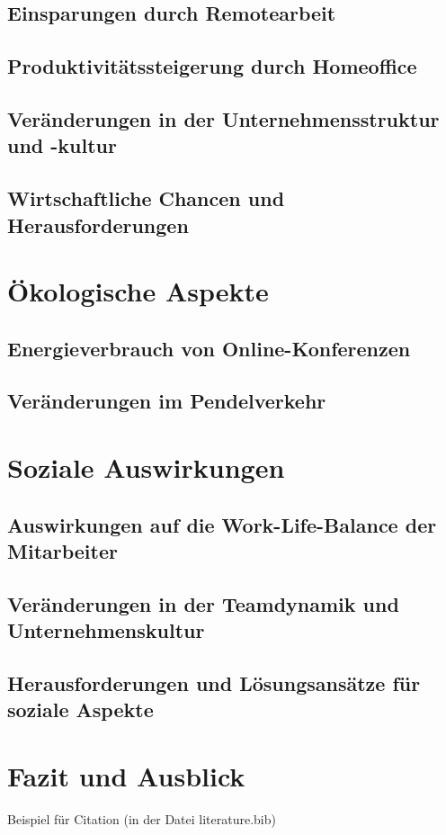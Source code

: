 \documentclass[runningheads]{llncs}
\begin{document}
\subsection{Einsparungen durch Remotearbeit}

\subsection{Produktivitätssteigerung durch Homeoffice}

\subsection{Veränderungen in der Unternehmensstruktur und -kultur}

\subsection{Wirtschaftliche Chancen und Herausforderungen}


\section{Ökologische Aspekte}

\subsection{Energieverbrauch von Online-Konferenzen}

\subsection{Veränderungen im Pendelverkehr}


\section{Soziale Auswirkungen}

\subsection{Auswirkungen auf die Work-Life-Balance der Mitarbeiter}

\subsection{Veränderungen in der Teamdynamik und Unternehmenskultur}

\subsection{Herausforderungen und Lösungsansätze für soziale Aspekte}


\section{Fazit und Ausblick}

Beispiel für Citation\cite{noauthor_internet-konferenz_2021}
(in der Datei literature.bib)




\end{document}
